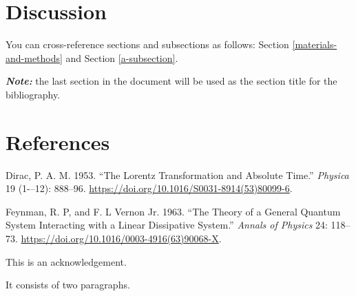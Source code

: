 \documentclass[12pt,halfline,a4paper,]{ouparticle}
\newlength{\cslhangindent}
\newenvironment{cslreferences}%
  {\setlength{\parindent}{0pt}%
  \everypar{\setlength{\hangindent}{\cslhangindent}}\ignorespaces}%
  {\par}
\begin{document}
\hypertarget{discussion}{%
\section{Discussion}\label{discussion}}

You can cross-reference sections and subsections as follows: Section \ref{materials-and-methods} and Section \ref{a-subsection}.

\textbf{\emph{Note:}} the last section in the document will be used as the section title for the bibliography.

\hypertarget{references}{%
\section*{References}\label{references}}

\hypertarget{refs}{}
\begin{cslreferences}
\leavevmode\hypertarget{ref-Dirac1953888}{}%
Dirac, P. A. M. 1953. ``The Lorentz Transformation and Absolute Time.'' \emph{Physica} 19 (1-\/--12): 888--96. \url{https://doi.org/10.1016/S0031-8914(53)80099-6}.

\leavevmode\hypertarget{ref-Feynman1963118}{}%
Feynman, R. P, and F. L Vernon Jr. 1963. ``The Theory of a General Quantum System Interacting with a Linear Dissipative System.'' \emph{Annals of Physics} 24: 118--73. \url{https://doi.org/10.1016/0003-4916(63)90068-X}.
\end{cslreferences}


\begin{notes}[Acknowledgements]
This is an acknowledgement.

It consists of two paragraphs.
\end{notes}
\end{document}
